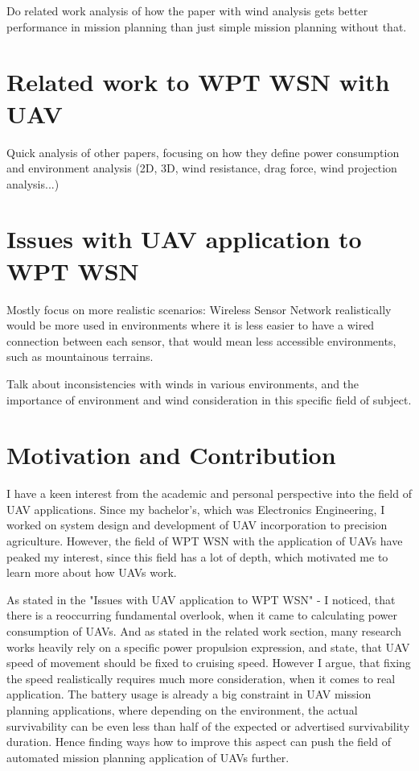 \documentclass[11pt,a4paper,footinclude=true,headinclude=true, oneside]{scrbook}
\begin{document}
Do related work analysis of how the paper with wind analysis gets better performance in mission planning than just simple mission planning without that.

\section{Related work to WPT WSN with UAV}

Quick analysis of other papers, focusing on how they define power consumption and environment analysis (2D, 3D, wind resistance, drag force, wind projection analysis...)

\section{Issues with UAV application to WPT WSN}

Mostly focus on more realistic scenarios: Wireless Sensor Network realistically would be more used in environments where it is less easier to have a wired connection between each sensor, that would mean less accessible environments, such as mountainous terrains.

Talk about inconsistencies with winds in various environments, and the importance of environment and wind consideration in this specific field of subject.

\section{Motivation and Contribution}

I have a keen interest from the academic and personal perspective into the field of UAV applications. Since my bachelor's, which was Electronics Engineering, I worked on system design and development of UAV incorporation to precision agriculture. However, the field of WPT WSN with the application of UAVs have peaked my interest, since this field has a lot of depth, which motivated me to learn more about how UAVs work.

As stated in the "Issues with UAV application to WPT WSN" - I noticed, that there is a reoccurring fundamental overlook, when it came to calculating power consumption of UAVs. And as stated in the related work section, many research works heavily rely on a specific power propulsion expression, and state, that UAV speed of movement should be fixed to cruising speed. However I argue, that fixing the speed realistically requires much more consideration, when it comes to real application. The battery usage is already a big constraint in UAV mission planning applications, where depending on the environment, the actual survivability can be even less than half of the expected or advertised survivability duration. Hence finding ways how to improve this aspect can push the field of automated mission planning application of UAVs further.
\end{document}
